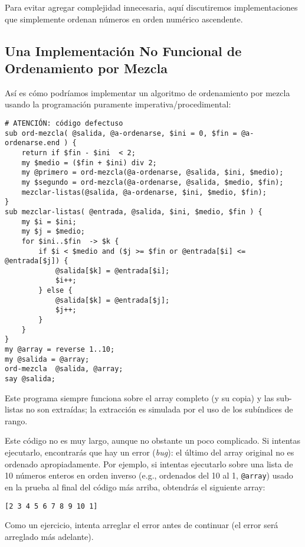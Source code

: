 Para evitar agregar complejidad innecesaria, aquí discutiremos 
implementaciones que simplemente ordenan números en orden 
numérico ascendente.


\subsection{Una Implementación No Funcional de Ordenamiento por Mezcla}

Así es cómo podríamos implementar un algoritmo de ordenamiento por mezcla
usando la programación puramente imperativa/procedimental:

\begin{verbatim}
# ATENCIÓN: código defectuso
sub ord-mezcla( @salida, @a-ordenarse, $ini = 0, $fin = @a-ordenarse.end ) {
    return if $fin - $ini  < 2;
    my $medio = ($fin + $ini) div 2;
    my @primero = ord-mezcla(@a-ordenarse, @salida, $ini, $medio);
    my $segundo = ord-mezcla(@a-ordenarse, @salida, $medio, $fin);
    mezclar-listas(@salida, @a-ordenarse, $ini, $medio, $fin);
}
sub mezclar-listas( @entrada, @salida, $ini, $medio, $fin ) {
    my $i = $ini;
    my $j = $medio;
    for $ini..$fin  -> $k {
        if $i < $medio and ($j >= $fin or @entrada[$i] <= @entrada[$j]) {
            @salida[$k] = @entrada[$i];
            $i++;
        } else {
            @salida[$k] = @entrada[$j];
            $j++;
        } 
    }
}
my @array = reverse 1..10;
my @salida = @array;
ord-mezcla  @salida, @array;
say @salida;
\end{verbatim}

Este programa siempre funciona sobre el array completo (y su copia)
y las sub-listas no son extraídas; la extracción es simulada por el
uso de los subíndices de rango.

Este código no es muy largo, aunque no obstante un poco complicado.
Si intentas ejecutarlo, encontrarás que hay un error (\emph{bug}):
el último del array original no es ordenado apropiadamente. Por 
ejemplo, si intentas ejecutarlo sobre una lista de 10 números enteros
en orden inverso (e.g., ordenados del 10 al 1, {\tt @array}) 
usado en la prueba al final del código más arriba, obtendrás 
el siguiente array:

\begin{verbatim}
[2 3 4 5 6 7 8 9 10 1]
\end{verbatim}


Como un ejercicio, intenta arreglar el error antes de continuar
(el error será arreglado más adelante).

